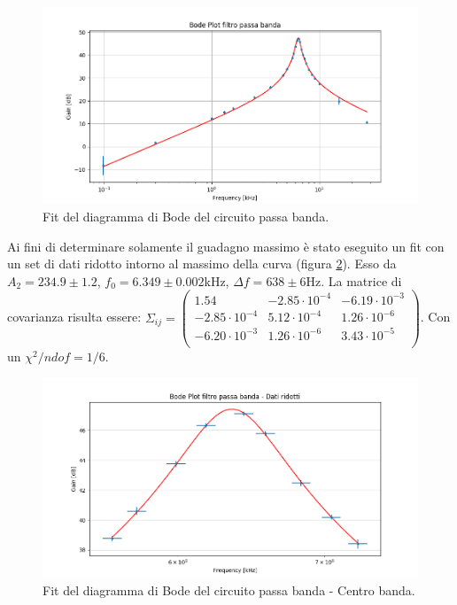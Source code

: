 \documentclass[10pt,a4paper]{article}
\begin{document}
\begin{figure}[!htb]
\centering
\includegraphics[scale=.7]{passabanda.png}
\caption{Fit del diagramma di Bode del circuito passa banda.\label{bandaFit}}
\end{figure}

Ai fini di determinare solamente il guadagno massimo è stato eseguito un fit con un set di dati ridotto intorno al massimo della curva (figura \ref{bandaFitRidotta}). Esso da $A_2 = 234.9 \pm 1.2$, $f_0 = 6.349 \pm 0.002$kHz, $\Delta f = 638 \pm 6$Hz. La matrice di covarianza risulta essere: $ \Sigma_{ij} = \left( \begin{array}{ccc}
1.54 & -2.85 \cdot 10^{-4} & -6.19 \cdot 10^{-3}\\ 
-2.85 \cdot 10^{-4} & 5.12 \cdot 10^{-4} & 1.26 \cdot 10^{-6}\\
-6.20 \cdot 10^{-3} & 1.26 \cdot 10^{-6} & 3.43 \cdot 10^{-5}\\
\end{array} \right)$. Con un $\chi^2/ndof = 1/6$.\\

\begin{figure}[!htb]
\centering
\includegraphics[scale=.7]{passaBandaRidotto.png}
\caption{Fit del diagramma di Bode del circuito passa banda - Centro banda.\label{bandaFitRidotta}}
\end{figure}
\end{document}
